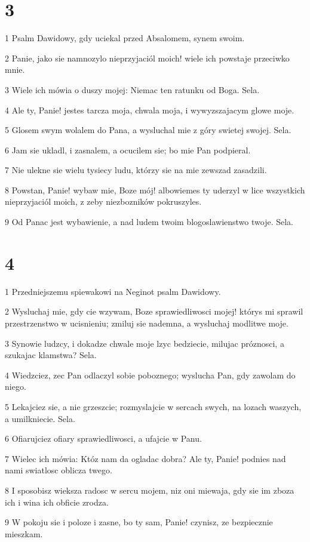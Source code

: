 \chapter{3}

\par 1 Psalm Dawidowy, gdy uciekal przed Absalomem, synem swoim.
\par 2 Panie, jako sie namnozylo nieprzyjaciól moich! wiele ich powstaje przeciwko mnie.
\par 3 Wiele ich mówia o duszy mojej: Niemac ten ratunku od Boga. Sela.
\par 4 Ale ty, Panie! jestes tarcza moja, chwala moja, i wywyzszajacym glowe moje.
\par 5 Glosem swym wolalem do Pana, a wysluchal mie z góry swietej swojej. Sela.
\par 6 Jam sie ukladl, i zasnalem, a ocucilem sie; bo mie Pan podpieral.
\par 7 Nie ulekne sie wielu tysiecy ludu, którzy sie na mie zewszad zasadzili.
\par 8 Powstan, Panie! wybaw mie, Boze mój! albowiemes ty uderzyl w lice wszystkich nieprzyjaciól moich, z zeby niezbozników pokruszyles.
\par 9 Od Panac jest wybawienie, a nad ludem twoim blogoslawienstwo twoje. Sela.

\chapter{4}

\par 1 Przedniejszemu spiewakowi na Neginot psalm Dawidowy.
\par 2 Wysluchaj mie, gdy cie wzywam, Boze sprawiedliwosci mojej! którys mi sprawil przestrzenstwo w ucisnieniu; zmiluj sie nademna, a wysluchaj modlitwe moje.
\par 3 Synowie ludzcy, i dokadze chwale moje lzyc bedziecie, milujac próznosci, a szukajac klamstwa? Sela.
\par 4 Wiedzciez, zec Pan odlaczyl sobie poboznego; wyslucha Pan, gdy zawolam do niego.
\par 5 Lekajciez sie, a nie grzeszcie; rozmyslajcie w sercach swych, na lozach waszych, a umilkniecie. Sela.
\par 6 Ofiarujciez ofiary sprawiedliwosci, a ufajcie w Panu.
\par 7 Wielec ich mówia: Któz nam da ogladac dobra? Ale ty, Panie! podnies nad nami swiatlosc oblicza twego.
\par 8 I sposobisz wieksza radosc w sercu mojem, niz oni miewaja, gdy sie im zboza ich i wina ich obficie zrodza.
\par 9 W pokoju sie i poloze i zasne, bo ty sam, Panie! czynisz, ze bezpiecznie mieszkam.

